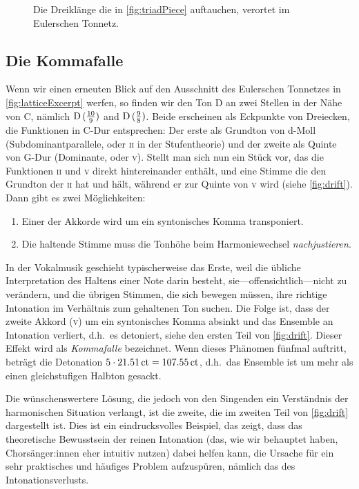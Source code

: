\documentclass[ngerman,11pt]{scrartcl}
\begin{document}
\begin{figure}
  
  \caption{Die Dreiklänge die in \cref{fig:triadPiece} auftauchen, verortet im
  	Eulerschen Tonnetz.}\label{fig:chordsLattice}
\end{figure}

\subsection{Die Kommafalle}

Wenn wir einen erneuten Blick auf den Ausschnitt des Eulerschen Tonnetzes in
\cref{fig:latticeExcerpt} werfen, so finden wir den Ton D an zwei Stellen in der
Nähe von C, nämlich \naturalm $\text{D}\,(\frac{10}9)$ and $\text{D}\,(\frac98)$. Beide
erscheinen als Eckpunkte von Dreiecken, die Funktionen in C-Dur entsprechen: Der
erste als Grundton von d-Moll (Subdominantparallele, oder \textsc{ii} in der
Stufentheorie) und der zweite als Quinte von G-Dur (Dominante, oder \textsc{v}).
Stellt man sich nun ein Stück vor, das die Funktionen \textsc{ii} und \textsc{v}
direkt hintereinander enthält, und eine Stimme die den Grundton der \textsc{ii}
hat und hält, während er zur Quinte von \textsc{v} wird (siehe
\cref{fig:drift}). Dann gibt es zwei Möglichkeiten:


\begin{enumerate}[itemsep=0em]
\item Einer der Akkorde wird um ein syntonisches Komma transponiert.
\item Die haltende Stimme muss die Tonhöhe beim Harmoniewechsel 
  \emph{nachjustieren}.
\end{enumerate}%
%
In der Vokalmusik geschieht typischerweise das Erste, weil die übliche
Interpretation des Haltens einer Note darin besteht, sie—offensichtlich—nicht zu
verändern, und die übrigen Stimmen, die sich bewegen müssen, ihre richtige
Intonation im Verhältnis zum gehaltenen Ton suchen. Die Folge ist, dass der
zweite Akkord (\textsc{v}) um ein syntonisches Komma absinkt und das Ensemble
an Intonation verliert, d.h.\ es detoniert, siehe den ersten Teil von
\cref{fig:drift}. Dieser Effekt wird als \emph{Kommafalle} bezeichnet. Wenn
dieses Phänomen fünfmal auftritt, beträgt die Detonation
$5\cdot 21.51\,\mathrm{ct}=107.55\,\mathrm{ct}$, d.h.\ das Ensemble ist um mehr als
einen gleichstufigen Halbton gesackt.

Die wünschenswertere Lösung, die jedoch von den Singenden ein Verständnis der
harmonischen Situation verlangt, ist die zweite, die im zweiten Teil von
\cref{fig:drift} dargestellt ist. Dies ist ein eindrucksvolles Beispiel, das
zeigt, dass das theoretische Bewusstsein der reinen Intonation (das, wie wir
behauptet haben, Chorsänger:innen eher intuitiv nutzen) dabei helfen kann, die
Ursache für ein sehr praktisches und häufiges Problem aufzuspüren, nämlich das
des Intonationsverlusts.
\end{document}

